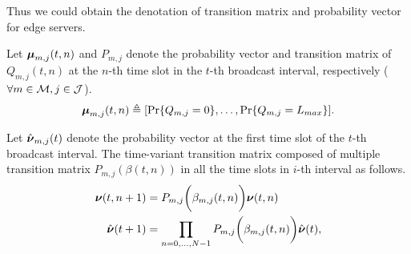 Thus we could obtain the denotation of transition matrix and probability vector for edge servers.
\begin{definition}
    Let $\boldsymbol{\mu}_{m,j}(t,n)$ and $P_{m,j}$ denote the probability vector and transition matrix of $Q_{m,j}(t,n)$ at the $n$-th time slot in the $t$-th broadcast interval, respectively ($\forall m\in\mathcal{M}, j\in\mathcal{J}$).
    \begin{align}
        \boldsymbol{\mu}_{m,j}(t,n) \triangleq [\Pr\{Q_{m,j}=0\}, \dots, \Pr\{Q_{m,j}=L_{max}\}].
    \end{align}

    Let $\hat{\boldsymbol{\nu}}_{m,j}(t)$ denote the probability vector at the first time slot of the $t$-th broadcast interval.
    The time-variant transition matrix composed of multiple transition matrix $P_{m,j}(\beta({t,n}))$ in all the time slots in $i$-th interval as follows.
    \begin{align}
        \boldsymbol{\nu}({t,n+1}) &= P_{m,j}\bigg(\beta_{m,j}({t,n})\bigg) \boldsymbol{\nu}({t,n})
        \\
        \hat{\boldsymbol{\nu}}(t+1) &= \prod_{n=0,\dots,N-1} P_{m,j}\bigg(\beta_{m,j}({t,n})\bigg) \hat{\boldsymbol{\nu}}(t),
        \label{eqn_4}
    \end{align}
\end{definition}

